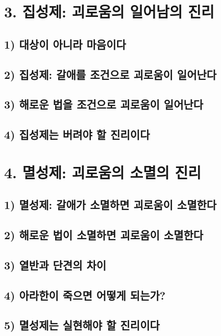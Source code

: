 \documentclass[12pt, a4paper, oneside]{book}
\begin{document}
	\newpage
	\chapter{3. 집성제: 괴로움의 일어남의 진리}
	\section{1) 대상이 아니라 마음이다}
	\section{2) 집성제: 갈애를 조건으로 괴로움이 일어난다}
	\section{3) 해로운 법을 조건으로 괴로움이 일어난다}
	\section{4) 집성제는 버려야 할 진리이다}

	\newpage
	\chapter{4. 멸성제: 괴로움의 소멸의 진리}
	\section{1) 멸성제: 갈애가 소멸하면 괴로움이 소멸한다}
	\section{2) 해로운 법이 소멸하면 괴로움이 소멸한다}
	\section{3) 열반과 단견의 차이}
	\section{4) 아라한이 죽으면 어떻게 되는가?}
	\section{5) 멸성제는 실현해야 할 진리이다}

	\newpage
\end{document}
